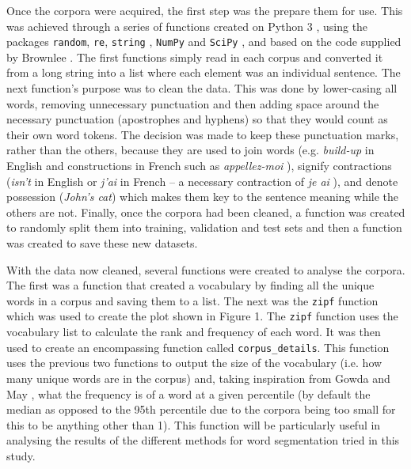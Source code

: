 \documentclass[11pt]{article}
\begin{document}
\bigskip

Once the corpora were acquired, the first step was the prepare them for use. This was achieved through a series of functions created on Python 3 \citep{python3}, using the packages \texttt{random}, \texttt{re}, \texttt{string} \citep{python-random}, \texttt{NumPy} \citep{2020NumPy-Array} and \texttt{SciPy} \citep{2020SciPy-NMeth}, and based on the code supplied by Brownlee \citeyearpar{brownlee_2018}. The first functions simply read in each corpus and converted it from a long string into a list where each element was an individual sentence. The next function's purpose was to clean the data. This was done by lower-casing all words, removing unnecessary punctuation and then adding space around the necessary punctuation (apostrophes and hyphens) so that they would count as their own word tokens. The decision was made to keep these punctuation marks, rather than the others, because they are used to join words (e.g. \textit{build-up} in English and constructions in French such as \textit{appellez-moi}%
), signify contractions (\textit{isn’t} in English or \textit{j’ai} in French -- a necessary contraction of \textit{je ai}%
), and denote possession (\textit{John’s cat}) which makes them key to the sentence meaning while the others are not. Finally, once the corpora had been cleaned, a function was created to randomly split them into training, validation and test sets and then a function was created to save these new datasets.

\bigskip

With the data now cleaned, several functions were created to analyse the corpora. The first was a function that created a vocabulary by finding all the unique words in a corpus and saving them to a list. The next was the \texttt{zipf} function which was used to create the plot shown in Figure 1. The \texttt{zipf} function uses the vocabulary list to calculate the rank and frequency of each word. It was then used to create an encompassing function called \texttt{corpus\_details}. This function uses the previous two functions to output the size of the vocabulary (i.e. how many unique words are in the corpus) and, taking inspiration from Gowda and May \citeyearpar{gowda-may-2020-finding}, what the frequency is of a word at a given percentile (by default the median as opposed to the 95th percentile due to the corpora being too small for this to be anything other than 1). This function will be particularly useful in analysing the results of the different methods for word segmentation tried in this study.
\end{document}
